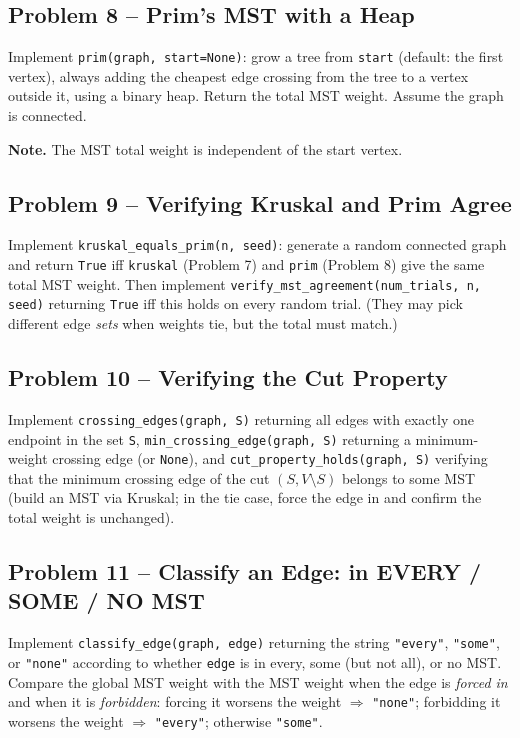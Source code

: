 \documentclass[11pt]{article}
\begin{document}
\subsection*{Problem 8 -- Prim's MST with a Heap}

Implement \texttt{prim(graph, start=None)}: grow a tree from \texttt{start} (default: the
first vertex), always adding the cheapest edge crossing from the tree to a vertex outside
it, using a binary heap. Return the total MST weight. Assume the graph is connected.

\textbf{Note.} The MST total weight is independent of the start vertex.

\subsection*{Problem 9 -- Verifying Kruskal and Prim Agree}

Implement \texttt{kruskal\_equals\_prim(n, seed)}: generate a random connected graph and
return \texttt{True} iff \texttt{kruskal} (Problem 7) and \texttt{prim} (Problem 8) give
the same total MST weight. Then implement \texttt{verify\_mst\_agreement(num\_trials, n,
seed)} returning \texttt{True} iff this holds on every random trial. (They may pick
different edge \emph{sets} when weights tie, but the total must match.)

\subsection*{Problem 10 -- Verifying the Cut Property}

Implement \texttt{crossing\_edges(graph, S)} returning all edges with exactly one endpoint
in the set \texttt{S}, \texttt{min\_crossing\_edge(graph, S)} returning a minimum-weight
crossing edge (or \texttt{None}), and \texttt{cut\_property\_holds(graph, S)} verifying
that the minimum crossing edge of the cut $(S, V\setminus S)$ belongs to some MST (build an
MST via Kruskal; in the tie case, force the edge in and confirm the total weight is
unchanged).

\subsection*{Problem 11 -- Classify an Edge: in EVERY / SOME / NO MST}

Implement \texttt{classify\_edge(graph, edge)} returning the string \texttt{"every"},
\texttt{"some"}, or \texttt{"none"} according to whether \texttt{edge} is in every, some
(but not all), or no MST. Compare the global MST weight with the MST weight when the edge
is \emph{forced in} and when it is \emph{forbidden}: forcing it worsens the weight
$\Rightarrow$ \texttt{"none"}; forbidding it worsens the weight $\Rightarrow$
\texttt{"every"}; otherwise \texttt{"some"}.
\end{document}
